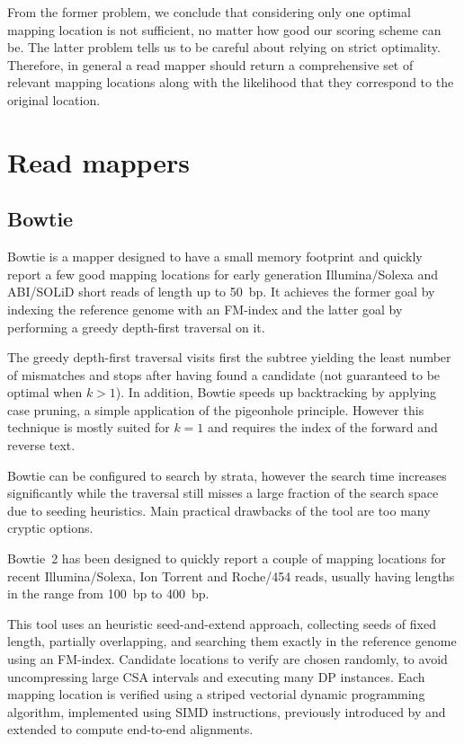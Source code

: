 From the former problem, we conclude that considering only one optimal mapping location is not sufficient, no matter how good our scoring scheme can be.
The latter problem tells us to be careful about relying on strict optimality.
Therefore, in general a read mapper should return a comprehensive set of relevant mapping locations along with the likelihood that they correspond to the original location.


\section{Read mappers}


\subsection{Bowtie}

Bowtie \citep{Bowtie} is a mapper designed to have a small memory footprint and quickly report a few good mapping locations for early generation Illumina/Solexa and ABI/SOLiD short reads of length up to 50~bp.
It achieves the former goal by indexing the reference genome with an FM-index and the latter goal by performing a greedy depth-first traversal on it.

The greedy depth-first traversal visits first the subtree yielding the least number of mismatches and stops after having found a candidate (not guaranteed to be optimal when $k>1$).
In addition, Bowtie speeds up backtracking by applying case pruning, a simple application of the pigeonhole principle.
However this technique is mostly suited for $k=1$ and requires the index of the forward and reverse text.

Bowtie can be configured to search by strata, however the search time increases significantly while the traversal still misses a large fraction of the search space due to seeding heuristics.
Main practical drawbacks of the tool are too many cryptic options.

Bowtie~2 \citep{Bowtie2} has been designed to quickly report a couple of mapping locations for recent Illumina/Solexa, Ion Torrent and Roche/454 reads, usually having lengths in the range from 100~bp to 400~bp.

This tool uses an heuristic seed-and-extend approach, collecting seeds of fixed length, partially overlapping, and searching them exactly in the reference genome using an FM-index.
Candidate locations to verify are chosen randomly, to avoid uncompressing large CSA intervals and executing many DP instances.
Each mapping location is verified using a striped vectorial dynamic programming algorithm, implemented using SIMD instructions, previously introduced by \citep{Farrar2007} and extended to compute end-to-end alignments.

